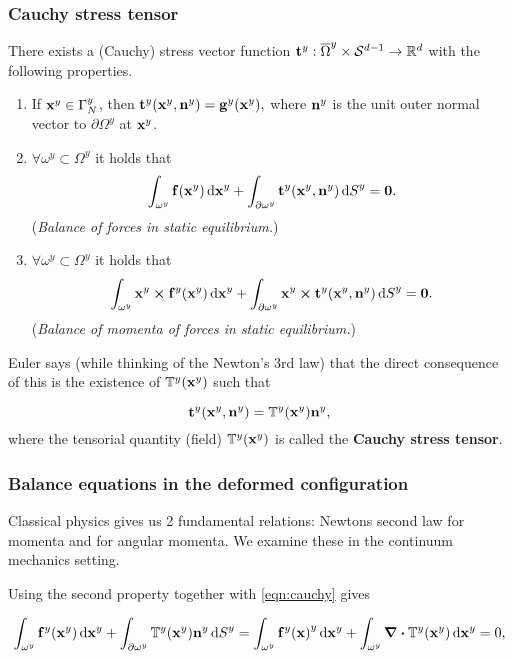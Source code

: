 \documentclass[11pt]{scrartcl} %
\begin{document}
\subsubsection{Cauchy stress tensor}
\label{sec:cstress}

\begin{lemma}
	There exists a (Cauchy) stress vector function $\vb{t}^y : \overline{\Omega}^y \times \mathcal{S}^{d-1} \to {\mathbb R}^d $ with the following properties.
\begin{enumerate}
	\item If $\vb{x}^y \in \Gamma^y_N$, then $\vb{t}^y(\vb{x}^y, \vb{n}^y) = \vb{g}^y(\vb{x}^y),$ where $\vb{n}^y$ is the unit outer normal vector to $\partial \Omega^y$ at $\vb{x}^y$.
	\item $\forall \omega^y \subset \Omega^y$ it holds that
		\[
			\int_{\omega^y} \vb{f}(\vb{x}^{y})\dd{\vb{x}^y} + \int_{\partial \omega^y} \vb{t}^y(\vb{x}^y, \vb{n}^y)\dd{S}^y = \vb{0}.
		\]
		(\textit{Balance of forces in static equilibrium.})
	\item $\forall \omega^y \subset \Omega^y$ it holds that
		\[
			\int_{\omega^y} \vb{x}^y \cross \vb{f}^y(\vb{x}^y) \dd{\vb{x}^y} + \int_{\partial \omega^y} \vb{x}^y \cross \vb{t}^y(\vb{x}^y, \vb{n}^y) \dd{S}^y = \vb{0}.
		\]
		 (\textit{Balance of momenta of forces in static equilibrium.})
\end{enumerate}
Euler says (while thinking of the Newton's 3rd law) that the direct consequence of this is the existence of $\mathbb{T}^y(\vb{x}^y)$ such that

\begin{equation}
	\label{eqn:cauchy}
\vb{t}^y(\vb{x}^y,\vb{n}^y) = \mathbb{T}^y(\vb{x}^y) \vb{n}^y, 
\end{equation}
where the tensorial quantity (field) $\mathbb{T}^y\qty(\vb{x}^{y})$ is called the \textbf{Cauchy stress tensor}.
\end{lemma}

\subsubsection{Balance equations in the deformed configuration}
\label{sec:balance_equations_cauchy}
Classical physics gives us 2 fundamental relations: Newtons second law for momenta and for angular momenta. We examine these in the continuum mechanics setting.

Using the second property together with \ref{eqn:cauchy} gives

\begin{equation}
	\int_{\omega^y} \vb{f}^y(\vb{x}^y) \dd{\vb{x}^y} + \int_{\partial \omega^y} \cstress(\vb{x}^y) \vb{n}^y \dd{S}^y  =\int_{\omega^{y}}\vb{f}^{y}\qty(\vb{x})^{y}\dd{\vb{x}^{y}}+ \int_{\omega^y} \divergence{\cstress}(\vb{x}^{y}) \dd{\vb{x}^{y}} = 0,
\end{equation}
\end{document}
